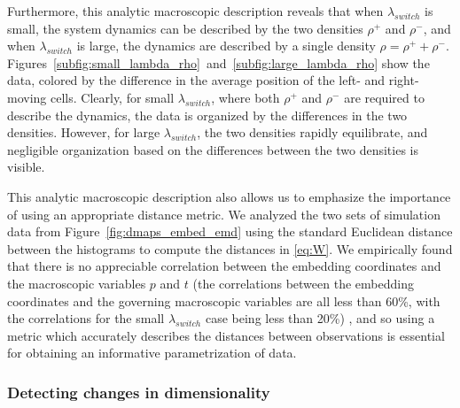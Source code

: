Furthermore, this analytic macroscopic description reveals that when $\lambda_{switch}$ is small, the system dynamics can be described by the two densities $\rho^+$ and $\rho^-$, and when $\lambda_{switch}$ is large, the dynamics are described by a single density $\rho = \rho^+ + \rho^-$.
%
Figures~\ref{subfig:small_lambda_rho}~and~\ref{subfig:large_lambda_rho} show the data, colored by the difference in the average position of the left- and right-moving cells.
%
Clearly, for small $\lambda_{switch}$, where both $\rho^+$ and $\rho^-$ are required to describe the dynamics, the data is organized by the differences in the two densities.
%
However, for large $\lambda_{switch}$, the two densities rapidly equilibrate, and negligible organization based on the differences between the two densities is visible.


This analytic macroscopic description also allows us to emphasize the importance of using an appropriate distance metric.
%
We analyzed the two sets of simulation data from Figure~\ref{fig:dmaps_embed_emd} using the standard Euclidean distance between the histograms to compute the distances in \eqref{eq:W}.
%
We empirically found that there is no appreciable correlation between the embedding coordinates and the macroscopic variables $p$ and $t$ (the correlations between the embedding coordinates and the governing macroscopic variables are all less than 60\%, with the correlations for the small $\lambda_{switch}$ case being less than 20\%)
%
, and so using a metric which accurately describes the distances between observations is essential for obtaining an informative parametrization of data.

\subsubsection{Detecting changes in dimensionality}

